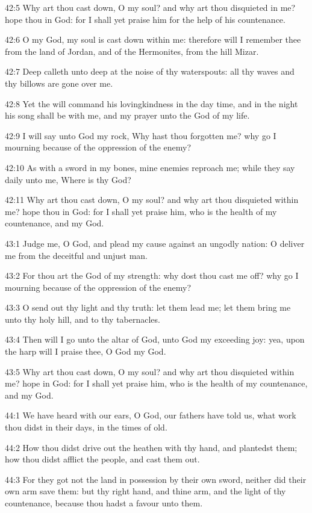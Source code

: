 42:5 Why art thou cast down, O my soul? and why art thou disquieted in
me?  hope thou in God: for I shall yet praise him for the help of his
countenance.

42:6 O my God, my soul is cast down within me: therefore will I
remember thee from the land of Jordan, and of the Hermonites, from the
hill Mizar.

42:7 Deep calleth unto deep at the noise of thy waterspouts: all thy
waves and thy billows are gone over me.

42:8 Yet the \LORD will command his lovingkindness in the day time, and
in the night his song shall be with me, and my prayer unto the God of
my life.

42:9 I will say unto God my rock, Why hast thou forgotten me? why go I
mourning because of the oppression of the enemy?

42:10 As with a sword in my bones, mine enemies reproach me; while
they say daily unto me, Where is thy God?

42:11 Why art thou cast down, O my soul? and why art thou disquieted
within me? hope thou in God: for I shall yet praise him, who is the
health of my countenance, and my God.



43:1 Judge me, O God, and plead my cause against an ungodly nation: O
deliver me from the deceitful and unjust man.

43:2 For thou art the God of my strength: why dost thou cast me off?
why go I mourning because of the oppression of the enemy?

43:3 O send out thy light and thy truth: let them lead me; let them
bring me unto thy holy hill, and to thy tabernacles.

43:4 Then will I go unto the altar of God, unto God my exceeding joy:
yea, upon the harp will I praise thee, O God my God.

43:5 Why art thou cast down, O my soul? and why art thou disquieted
within me? hope in God: for I shall yet praise him, who is the health
of my countenance, and my God.



44:1 We have heard with our ears, O God, our fathers have told us,
what work thou didst in their days, in the times of old.

44:2 How thou didst drive out the heathen with thy hand, and plantedst
them; how thou didst afflict the people, and cast them out.

44:3 For they got not the land in possession by their own sword,
neither did their own arm save them: but thy right hand, and thine
arm, and the light of thy countenance, because thou hadst a favour
unto them.

